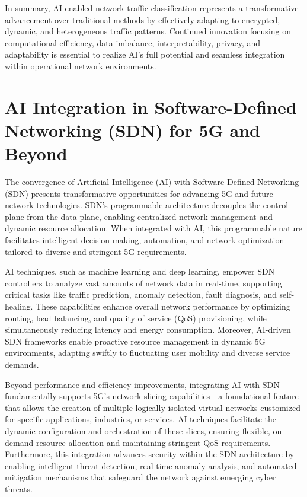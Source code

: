 \documentclass[sigconf]{acmart}
\begin{document}
In summary, AI-enabled network traffic classification represents a transformative advancement over traditional methods by effectively adapting to encrypted, dynamic, and heterogeneous traffic patterns. Continued innovation focusing on computational efficiency, data imbalance, interpretability, privacy, and adaptability is essential to realize AI’s full potential and seamless integration within operational network environments.

\section{AI Integration in Software-Defined Networking (SDN) for 5G and Beyond}

The convergence of Artificial Intelligence (AI) with Software-Defined Networking (SDN) presents transformative opportunities for advancing 5G and future network technologies. SDN’s programmable architecture decouples the control plane from the data plane, enabling centralized network management and dynamic resource allocation. When integrated with AI, this programmable nature facilitates intelligent decision-making, automation, and network optimization tailored to diverse and stringent 5G requirements.

AI techniques, such as machine learning and deep learning, empower SDN controllers to analyze vast amounts of network data in real-time, supporting critical tasks like traffic prediction, anomaly detection, fault diagnosis, and self-healing. These capabilities enhance overall network performance by optimizing routing, load balancing, and quality of service (QoS) provisioning, while simultaneously reducing latency and energy consumption. Moreover, AI-driven SDN frameworks enable proactive resource management in dynamic 5G environments, adapting swiftly to fluctuating user mobility and diverse service demands.

Beyond performance and efficiency improvements, integrating AI with SDN fundamentally supports 5G's network slicing capabilities—a foundational feature that allows the creation of multiple logically isolated virtual networks customized for specific applications, industries, or services. AI techniques facilitate the dynamic configuration and orchestration of these slices, ensuring flexible, on-demand resource allocation and maintaining stringent QoS requirements. Furthermore, this integration advances security within the SDN architecture by enabling intelligent threat detection, real-time anomaly analysis, and automated mitigation mechanisms that safeguard the network against emerging cyber threats.
\end{document}
